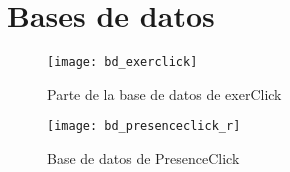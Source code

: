 \pagestyle{fancy}

\chapter{Bases de datos}
\label{anexo-c}

\begin{figure}[H]
	\centering
	\texttt{[image: bd\_exerclick]}
	\caption{Parte de la base de datos de exerClick}
	\label{fig:anexo-c:1}
\end{figure}

\begin{figure}[H]
	\centering
	\texttt{[image: bd\_presenceclick\_r]}
	\caption{Base de datos de PresenceClick}
	\label{fig:anexo-c:2}
\end{figure}